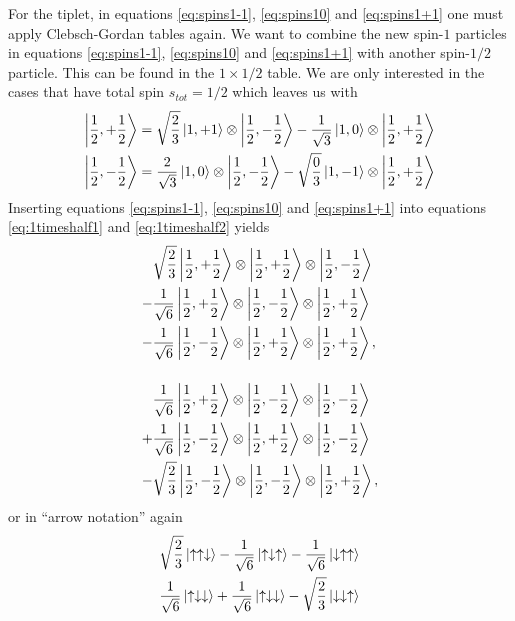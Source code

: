 \documentclass{article}
\begin{document}
For the tiplet, in equations \ref{eq:spins1-1}, \ref{eq:spins10} and \ref{eq:spins1+1} one must apply Clebsch-Gordan tables again. We want to combine the new spin-$1$ particles in equations \ref{eq:spins1-1}, \ref{eq:spins10} and \ref{eq:spins1+1} with another spin-$1/2$ particle. This can be found in the $1\times1/2$ table. We are only interested in the cases that have total spin $s_{tot}=1/2$ which leaves us with
\begin{align}
\label{eq:1timeshalf1}
\ket{\frac{1}{2},+\frac{1}{2}} &= \sqrt{\frac{2}{3}}\ket{1,+1}\otimes\ket{\frac{1}{2},-\frac{1}{2}}-\frac{1}{\sqrt{3}}\ket{1,0}\otimes\ket{\frac{1}{2},+\frac{1}{2}} \\
\label{eq:1timeshalf2}
\ket{\frac{1}{2},-\frac{1}{2}} &= \frac{2}{\sqrt{3}}\ket{1,0}\otimes\ket{\frac{1}{2},-\frac{1}{2}}-\sqrt{\frac{0}{3}}\ket{1,-1}\otimes\ket{\frac{1}{2},+\frac{1}{2}}
\end{align}
Inserting equations \ref{eq:spins1-1}, \ref{eq:spins10} and \ref{eq:spins1+1} into equations \ref{eq:1timeshalf1} and \ref{eq:1timeshalf2} yields
\begin{align*}
&\sqrt{\frac{2}{3}}\ket{\frac{1}{2},+\frac{1}{2}}\otimes\ket{\frac{1}{2},+\frac{1}{2}}\otimes\ket{\frac{1}{2},-\frac{1}{2}} \\
-&\frac{1}{\sqrt{6}}\ket{\frac{1}{2},+\frac{1}{2}}\otimes\ket{\frac{1}{2},-\frac{1}{2}}\otimes\ket{\frac{1}{2},+\frac{1}{2}} \\
-&\frac{1}{\sqrt{6}}\ket{\frac{1}{2},-\frac{1}{2}}\otimes\ket{\frac{1}{2},+\frac{1}{2}}\otimes\ket{\frac{1}{2},+\frac{1}{2}}, \\[3ex]
&\frac{1}{\sqrt{6}}\ket{\frac{1}{2},+\frac{1}{2}}\otimes\ket{\frac{1}{2},-\frac{1}{2}}\otimes\ket{\frac{1}{2},-\frac{1}{2}} \\
+&\frac{1}{\sqrt{6}}\ket{\frac{1}{2},-\frac{1}{2}}\otimes\ket{\frac{1}{2},+\frac{1}{2}}\otimes\ket{\frac{1}{2},-\frac{1}{2}} \\
-&\sqrt{\frac{2}{3}}\ket{\frac{1}{2},-\frac{1}{2}}\otimes\ket{\frac{1}{2},-\frac{1}{2}}\otimes\ket{\frac{1}{2},+\frac{1}{2}},
\end{align*}
or in ``arrow notation'' again
\begin{align}
\sqrt{\frac{2}{3}}\ket{\uparrow\uparrow\downarrow}-\frac{1}{\sqrt{6}}\ket{\uparrow\downarrow\uparrow}-\frac{1}{\sqrt{6}}\ket{\downarrow\uparrow\uparrow} \\
\frac{1}{\sqrt{6}}\ket{\uparrow\downarrow\downarrow}+\frac{1}{\sqrt{6}}\ket{\uparrow\downarrow\downarrow}-\sqrt{\frac{2}{3}}\ket{\downarrow\downarrow\uparrow}
\end{align}
\end{document}
